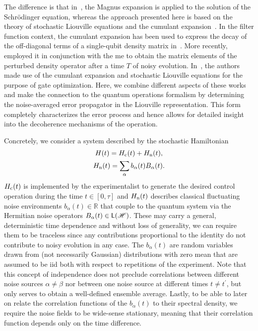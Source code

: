 The difference is that in~, the Magnus expansion is applied to the solution of the Schrödinger equation, whereas the approach presented here is based on the theory of stochastic Liouville equations and the cumulant expansion~\cite{Kubo1962,Kubo1963}.
In the filter function context, the cumulant expansion has been used to express the decay of the off-diagonal terms of a single-qubit density matrix in~.
More recently,~\citet{Paz-Silva2014} employed it in conjunction with the \gls{me} to obtain the matrix elements of the perturbed density operator after a time $T$ of noisy evolution.
In~, the authors made use of the cumulant expansion and stochastic Liouville equations for the purpose of gate optimization.
Here, we combine different aspects of these works and make the connection to the quantum operations formalism by determining the noise-averaged error propagator in the Liouville representation.
This form completely characterizes the error process and hence allows for detailed insight into the decoherence mechanisms of the operation.

Concretely, we consider a system described by the stochastic Hamiltonian
\begin{gather}
    H(t) = H_{\mathrm{c}}(t) + H_{\mathrm{n}}(t),\label{eq:ff:hamiltonian} \\
    H_{\mathrm{n}}(t) = \sum_\alpha b_\alpha(t) B_\alpha(t). \label{eq:ff:hamiltonian:noise}
\end{gather}
$H_{\mathrm{c}}(t)$ is implemented by the experimentalist to generate the desired control operation during the time $t\in [0, \tau]$ and $H_{\mathrm{n}}(t)$ describes classical fluctuating noise environments $b_\alpha(t)\in\mathbb{R}$ that couple to the quantum system via the Hermitian noise operators $B_\alpha(t)\in\mathsf{L}(\mathscr{H})$.
These may carry a general, deterministic time dependence and without loss of generality, we can require them to be traceless since any contributions proportional to the identity do not contribute to noisy evolution in any case.
The $b_\alpha(t)$ are random variables drawn from (not necessarily Gaussian) distributions with zero mean that are assumed to be \acrshort{iid} both with respect to repetitions of the experiment.
Note that this concept of independence does not preclude correlations between different noise sources $\alpha\neq\beta$ nor between one noise source at different times $t\neq t^\prime$, but only serves to obtain a well-defined ensemble average.
Lastly, to be able to later on relate the correlation functions of the $b_\alpha(t)$ to their spectral density, we require the noise fields to be wide-sense stationary, meaning that their correlation function depends only on the time difference.

